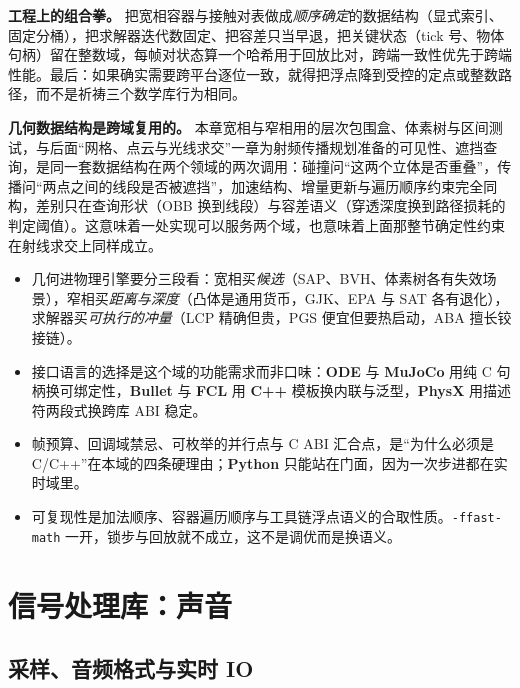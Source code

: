 \documentclass[12pt,a4paper,fontset=fandol]{ctexbook}
\newcommand{\Tp}[1]{\texttt{#1}}
\newcommand{\Lib}[1]{\textbf{#1}}
\newcommand{\Lang}[1]{\textsf{\bfseries #1}}
\newcommand{\CPP}{\Lang{C++}}
\newcommand{\PY}{\Lang{Python}}
\begin{document}
\textbf{工程上的组合拳。} 把宽相容器与接触对表做成\emph{顺序确定}的数据结构（显式索引、固定分桶），把求解器迭代数固定、把容差只当早退，把关键状态（tick 号、物体句柄）留在整数域，每帧对状态算一个哈希用于回放比对，跨端一致性优先于跨端性能。最后：如果确实需要跨平台逐位一致，就得把浮点降到受控的定点或整数路径，而不是祈祷三个数学库行为相同。

\textbf{几何数据结构是跨域复用的。} 本章宽相与窄相用的层次包围盒、体素树与区间测试，与后面``网格、点云与光线求交''一章为射频传播规划准备的可见性、遮挡查询，是同一套数据结构在两个领域的两次调用：碰撞问``这两个立体是否重叠''，传播问``两点之间的线段是否被遮挡''，加速结构、增量更新与遍历顺序约束完全同构，差别只在查询形状（OBB 换到线段）与容差语义（穿透深度换到路径损耗的判定阈值）。这意味着一处实现可以服务两个域，也意味着上面那整节确定性约束在射线求交上同样成立。

\begin{guideline}[title={本章要点}]
\begin{itemize}
\item 几何进物理引擎要分三段看：宽相买\emph{候选}（SAP、BVH、体素树各有失效场景），窄相买\emph{距离与深度}（凸体是通用货币，GJK、EPA 与 SAT 各有退化），求解器买\emph{可执行的冲量}（LCP 精确但贵，PGS 便宜但要热启动，ABA 擅长铰接链）。
\item 接口语言的选择是这个域的功能需求而非口味：\Lib{ODE} 与 \Lib{MuJoCo} 用纯 C 句柄换可绑定性，\Lib{Bullet} 与 \Lib{FCL} 用 \CPP{} 模板换内联与泛型，\Lib{PhysX} 用描述符两段式换跨库 ABI 稳定。
\item 帧预算、回调域禁忌、可枚举的并行点与 C ABI 汇合点，是``为什么必须是 C/C++''在本域的四条硬理由；\PY{} 只能站在门面，因为一次步进都在实时域里。
\item 可复现性是加法顺序、容器遍历顺序与工具链浮点语义的合取性质。\Tp{-ffast-math} 一开，锁步与回放就不成立，这不是调优而是换语义。
\end{itemize}
\end{guideline}

\part{信号处理库：声音}

\chapter{采样、音频格式与实时 IO}
\end{document}
